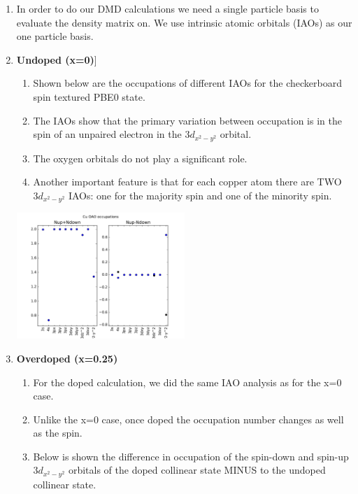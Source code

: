 \documentclass{article}
\begin{document}
\begin{enumerate}
\item In order to do our DMD calculations we need a single particle basis to evaluate the density matrix on.  We use intrinsic atomic orbitals (IAOs) as our one particle basis.

\item \textbf{Undoped (x=0)}]
\begin{enumerate}
\item Shown below are the occupations of different IAOs for the checkerboard spin textured PBE0 state. 

\item The IAOs show that the primary variation between occupation is in the spin of an unpaired electron in the $3d_{x^2-y^2}$ orbital. 

\item The oxygen orbitals do not play a significant role.

\item Another important feature is that for each copper atom there are TWO $3d_{x^2-y^2}$ IAOs: one for the majority spin and one of the minority spin.

\end{enumerate}
\includegraphics[width=0.5\textwidth]{../undoped/PBE0_8/CHK/dens_iao2_cu.pdf}
\linebreak

\item \textbf{Overdoped (x=0.25)}
\begin{enumerate}
\item For the doped calculation, we did the same IAO analysis as for the x=0 case. 

\item Unlike the x=0 case, once doped the occupation number changes as well as the spin. 

\item Below is shown the difference in occupation of the spin-down and spin-up $3d_{x^2-y^2}$ orbitals of the doped collinear state MINUS to the undoped collinear state. 


\end{enumerate}
\end{enumerate}
\end{document}
